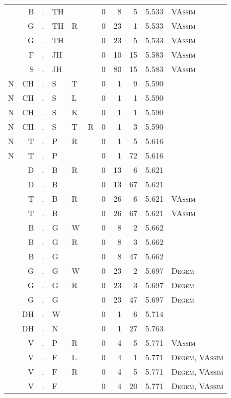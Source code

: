 \begin{longtable}{r@{ } r@{ } c@{ } l@{ } l@{ } l@{ } r r r r l }
  & B & . & TH &   &   & 0 & 8 & 5 & 5.533 & \textsc{VAssim} \\
  & G & . & TH & R &   & 0 & 23 & 1 & 5.533 & \textsc{VAssim} \\
  & G & . & TH &   &   & 0 & 23 & 5 & 5.533 & \textsc{VAssim} \\
  & F & . & JH &   &   & 0 & 10 & 15 & 5.583 & \textsc{VAssim} \\
  & S & . & JH &   &   & 0 & 80 & 15 & 5.583 & \textsc{VAssim} \\
N & CH & . & S & T &   & 0 & 1 & 9 & 5.590 &  \\
N & CH & . & S & L &   & 0 & 1 & 1 & 5.590 &  \\
N & CH & . & S & K &   & 0 & 1 & 1 & 5.590 &  \\
N & CH & . & S & T & R & 0 & 1 & 3 & 5.590 &  \\
N & T & . & P & R &   & 0 & 1 & 5 & 5.616 &  \\
N & T & . & P &   &   & 0 & 1 & 72 & 5.616 &  \\
  & D & . & B & R &   & 0 & 13 & 6 & 5.621 &  \\
  & D & . & B &   &   & 0 & 13 & 67 & 5.621 &  \\
  & T & . & B & R &   & 0 & 26 & 6 & 5.621 & \textsc{VAssim} \\
  & T & . & B &   &   & 0 & 26 & 67 & 5.621 & \textsc{VAssim} \\
  & B & . & G & W &   & 0 & 8 & 2 & 5.662 &  \\
  & B & . & G & R &   & 0 & 8 & 3 & 5.662 &  \\
  & B & . & G &   &   & 0 & 8 & 47 & 5.662 &  \\
  & G & . & G & W &   & 0 & 23 & 2 & 5.697 & \textsc{Degem} \\
  & G & . & G & R &   & 0 & 23 & 3 & 5.697 & \textsc{Degem} \\
  & G & . & G &   &   & 0 & 23 & 47 & 5.697 & \textsc{Degem} \\
  & DH & . & W &   &   & 0 & 1 & 6 & 5.714 &  \\
  & DH & . & N &   &   & 0 & 1 & 27 & 5.763 &  \\
  & V & . & P & R &   & 0 & 4 & 5 & 5.771 & \textsc{VAssim} \\
  & V & . & F & L &   & 0 & 4 & 1 & 5.771 & \textsc{Degem}, \textsc{VAssim} \\
  & V & . & F & R &   & 0 & 4 & 5 & 5.771 & \textsc{Degem}, \textsc{VAssim} \\
  & V & . & F &   &   & 0 & 4 & 20 & 5.771 & \textsc{Degem}, \textsc{VAssim} \\

\end{longtable}
